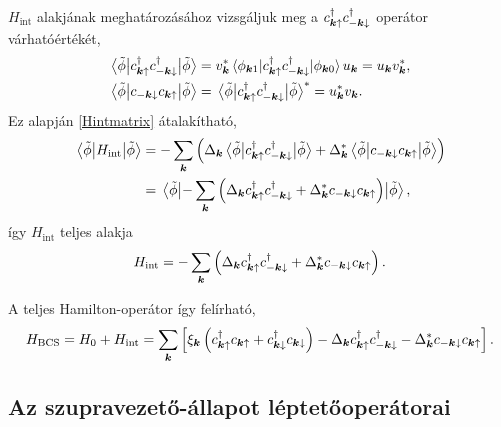 \documentclass[a4paper,12pt,titlepage]{article}
\newcommand{\KK}{{\vb*{k}}}
\begin{document}
$H_\text{int}$ alakjának meghatározásához vizsgáljuk meg a $c_{\KK \uparrow}^\dagger c_{-\KK \downarrow}^\dagger$ operátor várhatóértékét,
\begin{equation}
\begin{split}
	\matrixelement{\tilde{\phi}}{c_{\KK \uparrow}^\dagger c_{-\KK \downarrow}^\dagger}{\tilde{\phi}} & = v_\KK^* \matrixelement{\phi_{\KK 1}}{c_{\KK \uparrow}^\dagger c_{-\KK \downarrow}^\dagger}{\phi_{\KK 0}} u_\KK = u_\KK v_\KK^*, \\
	\matrixelement{\tilde{\phi}}{c_{-\KK \downarrow} c_{\KK \uparrow}}{\tilde{\phi}} & = \matrixelement{\tilde{\phi}}{c_{\KK \uparrow}^\dagger c_{-\KK \downarrow}^\dagger}{\tilde{\phi}}^* = u_\KK^* v_\KK.
\end{split}
\end{equation}
Ez alapján \eqref{Hintmatrix} átalakítható,
\begin{equation}
\begin{split}
	\matrixelement{\tilde{\phi}}{H_\text{int}}{\tilde{\phi}} & = - \sum\limits_\KK \left( \Delta_\KK \matrixelement{\tilde{\phi}}{c_{\KK \uparrow}^\dagger c_{-\KK \downarrow}^\dagger}{\tilde{\phi}} + \Delta_\KK^* \matrixelement{\tilde{\phi}}{c_{-\KK \downarrow} c_{\KK \uparrow}}{\tilde{\phi}} \right) \\
	& = \matrixelement{\tilde{\phi}}{- \sum\limits_\KK \left( \Delta_\KK c_{\KK \uparrow}^\dagger c_{-\KK \downarrow}^\dagger + \Delta_\KK^* c_{-\KK \downarrow} c_{\KK \uparrow} \right)}{\tilde{\phi}},
\end{split}
\end{equation}
így $H_\text{int}$ teljes alakja
\begin{equation}
	H_\text{int} = - \sum\limits_\KK \left( \Delta_\KK c_{\KK \uparrow}^\dagger c_{-\KK \downarrow}^\dagger + \Delta_\KK^* c_{-\KK \downarrow} c_{\KK \uparrow} \right).
\end{equation}

A teljes Hamilton-operátor így felírható,
\begin{equation}
	H_\text{BCS} = H_0 + H_\text{int} = \sum\limits_\KK \left[ \xi_\KK \left( c_{\KK \uparrow}^\dagger c_{\KK \uparrow} + c_{\KK \downarrow}^\dagger c_{\KK \downarrow} \right) - \Delta_\KK c_{\KK \uparrow}^\dagger c_{-\KK \downarrow}^\dagger - \Delta_\KK^* c_{-\KK \downarrow} c_{\KK \uparrow} \right].
\end{equation}


\subsection{Az szupravezető-állapot léptetőoperátorai}
\end{document}
